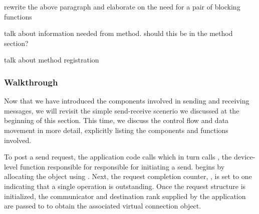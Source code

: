 \todo [BRT] rewrite the above paragraph and elaborate on the need for a pair
of blocking functions

\todo talk about information needed from method.  should this be in the
method section?

\todo talk about method registration

% 


\subsubsection{Walkthrough}
\label{sssec:walkthrough}


Now that we have introduced the components involved in sending and receiving
messages, we will revisit the simple send-receive scenerio we discussed at the
beginning of this section.  This time, we discuss the control flow and data
movement in more detail, explicitly listing the components and functions
involved.


To post a send request, the application code calls  which in
turn calls , the device-level function responsible for
responsible for initiating a send.   begins by allocating the
 object using .  Next, the
request completion counter, , is set to one indicating
that a single operation is outstanding.  Once the request structure is
initialized, the communicator and destination rank supplied by the application
are passed to  to obtain the associated virtual
connection object.

